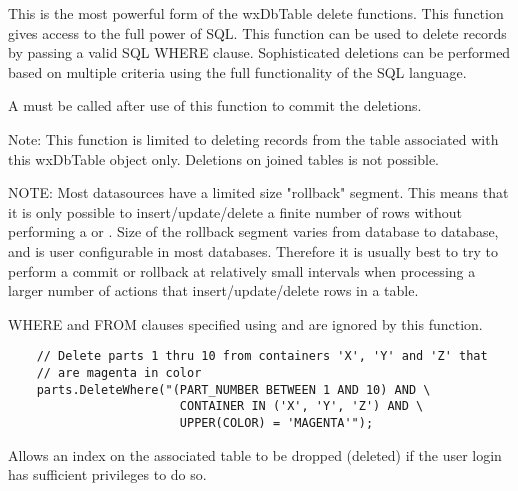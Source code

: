 
This is the most powerful form of the wxDbTable delete functions.  This 
function gives access to the full power of SQL.  This function can be used 
to delete records by passing a valid SQL WHERE clause.  Sophisticated 
deletions can be performed based on multiple criteria using the full 
functionality of the SQL language.  

A  must be called after use of 
this function to commit the deletions.

Note: This function is limited to deleting records from the table associated 
with this wxDbTable object only.  Deletions on joined tables is not possible.

NOTE: Most datasources have a limited size "rollback" segment.  This means 
that it is only possible to insert/update/delete a finite number of rows 
without performing a  or 
.  Size of the rollback 
segment varies from database to database, and is user configurable in 
most databases.  Therefore it is usually best to try to perform a commit 
or rollback at relatively small intervals when processing a larger number 
of actions that insert/update/delete rows in a table.

WHERE and FROM clauses specified using  
and  are ignored by 
this function.


\begin{verbatim}
    // Delete parts 1 thru 10 from containers 'X', 'Y' and 'Z' that 
    // are magenta in color
    parts.DeleteWhere("(PART_NUMBER BETWEEN 1 AND 10) AND \
                        CONTAINER IN ('X', 'Y', 'Z') AND \
                        UPPER(COLOR) = 'MAGENTA'");
\end{verbatim}


\label{wxdbtabledropindex}


Allows an index on the associated table to be dropped (deleted) if the user 
login has sufficient privileges to do so.



